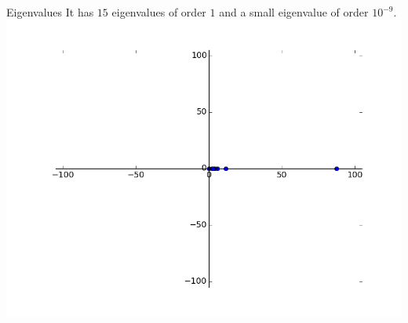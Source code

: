 \documentclass{beamer}
\theoremstyle{plain}
\theoremstyle{definition}
\theoremstyle{remark}
\begin{document}
\begin{frame}{Eigenvalues}
  It has $15$ eigenvalues of order $1$ and a small eigenvalue of order $10^{-9}$.
  \includegraphics[width=\textwidth,height=\textheight]{"moler/eigs"}
\end{frame}
\end{document}

